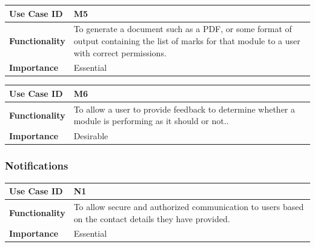 \documentclass[a4paper,12pt]{article}
\begin{document}
        	\begin{center}
        		\begin{tabularx}{\textwidth}{ |X|X| }
        			
        			\hline
        			\textbf{Use Case ID} & M5 \\
        			\hline
        			\textbf{Functionality} & To generate a document such as a PDF, or some format of output containing the list of marks for that module to a user with correct permissions. \\
        			\hline
        			\textbf{Importance} & Essential \\
        			\hline
        			
        		\end{tabularx}
        	\end{center}
        
	        \begin{center}
        		\begin{tabularx}{\textwidth}{ |X|X| }
        			
        			\hline
        			\textbf{Use Case ID} & M6 \\
        			\hline
        			\textbf{Functionality} & To allow a user to provide feedback to determine whether a module is performing as it should or not.. \\
        			\hline
        			\textbf{Importance} & Desirable \\
        			\hline
        			
        		\end{tabularx}
        	\end{center}
        
        	\subsubsection{Notifications}
        	
        	\begin{center}
        		\begin{tabularx}{\textwidth}{ |X|X| }
        			
        			\hline
        			\textbf{Use Case ID} & N1 \\
        			\hline
        			\textbf{Functionality} & To allow secure and authorized communication to users based on the contact details they have provided. \\
        			\hline
        			\textbf{Importance} & Essential \\
        			\hline
        			
        		\end{tabularx}
        	\end{center}
        	
\end{document}
